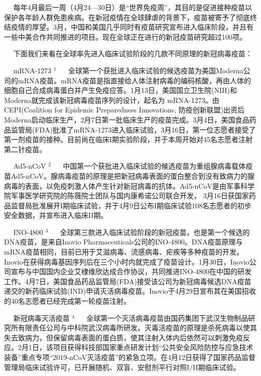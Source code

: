 \documentclass[
]{article}
\begin{document}
\vspace{-3mm}

\(\quad\)
每年4月最后一周（4月24---30日）是``世界免疫周''，其目的是促进接种疫苗以保护各年龄人群免患疾病。在新冠疫情在全球肆虐的背景下，疫苗被寄予了彻底终结疫情的厚望。3月，中国和美国几乎同时有疫苗研究宣布进入临床阶段，并且有一些中美合作共同推进的项目。现在全球正在进行的新冠疫苗研究超过100项。

\(\quad\)
下面我们来看在全球率先进入临床试验阶段的几款不同原理的新冠病毒疫苗：

\(\quad\) mRNA-1273 \(^1\) \(\quad\)
全球第一个获批进入临床试验的候选疫苗为美国Moderna公司的mRNA疫苗。mRNA疫苗是指直接给人体注射病毒的编码核酸，再由人体的细胞自己合成病毒蛋白并产生免疫应答。1月13日，美国国立卫生院(NIH)和Moderna就完成该新冠病毒疫苗序列的设计，起名为
mRNA-1273。由CEPI(Coalition for Epidemic Preparedness Innovations,
防疫创新联盟)出资后Moderna启动临床生产，2月7日第一批临床生产的疫苗完成。3月4日，美国食品药品监管局(FDA)批准了mRNA-1273进入临床试验，3月16日，第一位志愿者接受了第一剂疫苗的接种。目前尚在临床I期实验阶段，并于本周开始对45名志愿者注射第二针疫苗。

\(\quad\) Ad5-nCoV \(^2\) \(\quad\)
中国第一个获批进入临床试验的候选疫苗为重组腺病毒载体疫苗Ad5-nCoV。腺病毒疫苗的原理是把新冠病毒表面的蛋白整合到没有致病力的腺病毒的表面，以免疫刺激人体产生针对新冠病毒的抗体。Ad5-nCoV是由军事科学院军事医学研究院的陈薇院士团队与国内康希诺公司联合开发，
3月16日获国家药品监督局批准展开I期临床试验，并于4月9日公布I期临床试验108名志愿者的初步安全数据，并宣布进入临床II期。

\(\quad\) INO-4800 \(^3\) \(\quad\)
全球第三款进入临床试验阶段的新冠疫苗，也是第一个候选的DNA疫苗，是来自Inovio
Pharmaceuticals公司的INO-4800。DNA疫苗原理与mRNA疫苗相同，目前已用于艾滋病毒、流感病毒、疟疾等多种疫苗的开发。Inovio在获得病毒基因序列后在三个小时内就完成了疫苗设计。1月30日，Inovio公司宣布与中国国内企业艾棣维欣达成合作协议，共同推进INO-4800在中国的研发工作。4月7日，美国食品药品监管局(FDA)接受该公司为新冠病毒候选DNA疫苗递交的新药临床试验(IND)申请灭活病毒疫苗。Inovio于4月29日宣布其在美国招收的40名志愿者已经完成第一轮疫苗注射。

\(\quad\) 新冠病毒灭活疫苗 \(^4\) \(\quad\)
全球第一个灭活病毒疫苗由国药集团下武汉生物制品研究所有限责任公司与中科院武汉病毒所研发。灭毒活疫苗的原理是杀死病毒以使其失去致病力，但保留病毒表面的蛋白质，使其注射入体内后依然可以刺激免疫反应。2月1日，该项目获得科技部国家重点研发计划``公共安全风险防控与应急技术装备''重点专项``2019-nCoV灭活疫苗''的紧急立项。在4月12日获得了国家药品监督管理局临床试验许可，已开展随机、双盲、安慰剂平行对照I/II期临床试验。
\end{document}
